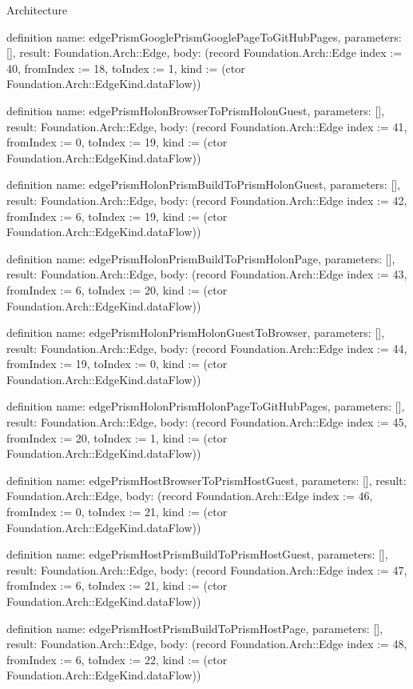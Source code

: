 \begin{lexlean}{Architecture}
\begin{semanticmodule}
definition{
  name: edgePrismGooglePrismGooglePageToGitHubPages,
  parameters: [],
  result: Foundation.Arch::Edge,
  body: (record Foundation.Arch::Edge {index := 40, fromIndex := 18, toIndex := 1, kind := (ctor Foundation.Arch::EdgeKind.dataFlow)})
}

definition{
  name: edgePrismHolonBrowserToPrismHolonGuest,
  parameters: [],
  result: Foundation.Arch::Edge,
  body: (record Foundation.Arch::Edge {index := 41, fromIndex := 0, toIndex := 19, kind := (ctor Foundation.Arch::EdgeKind.dataFlow)})
}

definition{
  name: edgePrismHolonPrismBuildToPrismHolonGuest,
  parameters: [],
  result: Foundation.Arch::Edge,
  body: (record Foundation.Arch::Edge {index := 42, fromIndex := 6, toIndex := 19, kind := (ctor Foundation.Arch::EdgeKind.dataFlow)})
}

definition{
  name: edgePrismHolonPrismBuildToPrismHolonPage,
  parameters: [],
  result: Foundation.Arch::Edge,
  body: (record Foundation.Arch::Edge {index := 43, fromIndex := 6, toIndex := 20, kind := (ctor Foundation.Arch::EdgeKind.dataFlow)})
}

definition{
  name: edgePrismHolonPrismHolonGuestToBrowser,
  parameters: [],
  result: Foundation.Arch::Edge,
  body: (record Foundation.Arch::Edge {index := 44, fromIndex := 19, toIndex := 0, kind := (ctor Foundation.Arch::EdgeKind.dataFlow)})
}

definition{
  name: edgePrismHolonPrismHolonPageToGitHubPages,
  parameters: [],
  result: Foundation.Arch::Edge,
  body: (record Foundation.Arch::Edge {index := 45, fromIndex := 20, toIndex := 1, kind := (ctor Foundation.Arch::EdgeKind.dataFlow)})
}

definition{
  name: edgePrismHostBrowserToPrismHostGuest,
  parameters: [],
  result: Foundation.Arch::Edge,
  body: (record Foundation.Arch::Edge {index := 46, fromIndex := 0, toIndex := 21, kind := (ctor Foundation.Arch::EdgeKind.dataFlow)})
}

definition{
  name: edgePrismHostPrismBuildToPrismHostGuest,
  parameters: [],
  result: Foundation.Arch::Edge,
  body: (record Foundation.Arch::Edge {index := 47, fromIndex := 6, toIndex := 21, kind := (ctor Foundation.Arch::EdgeKind.dataFlow)})
}

definition{
  name: edgePrismHostPrismBuildToPrismHostPage,
  parameters: [],
  result: Foundation.Arch::Edge,
  body: (record Foundation.Arch::Edge {index := 48, fromIndex := 6, toIndex := 22, kind := (ctor Foundation.Arch::EdgeKind.dataFlow)})
}


\end{semanticmodule}
\end{lexlean}
